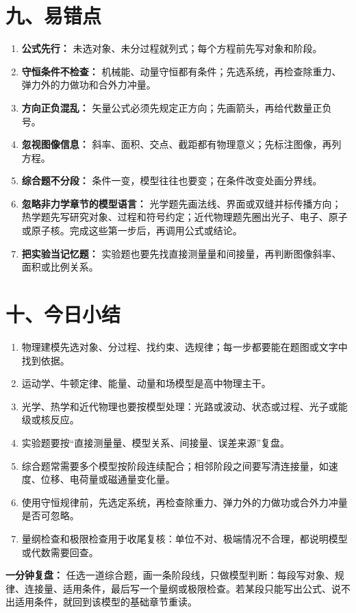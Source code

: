 \section*{九、易错点}
\begin{mistakebox}
\begin{enumerate}
  \item \textbf{公式先行：} 未选对象、未分过程就列式；每个方程前先写对象和阶段。
  \item \textbf{守恒条件不检查：} 机械能、动量守恒都有条件；先选系统，再检查除重力、弹力外的力做功和合外力冲量。
  \item \textbf{方向正负混乱：} 矢量公式必须先规定正方向；先画箭头，再给代数量正负号。
  \item \textbf{忽视图像信息：} 斜率、面积、交点、截距都有物理意义；先标注图像，再列方程。
  \item \textbf{综合题不分段：} 条件一变，模型往往也要变；在条件改变处画分界线。
  \item \textbf{忽略非力学章节的模型语言：} 光学题先画法线、界面或双缝并标传播方向；热学题先写研究对象、过程和符号约定；近代物理题先圈出光子、电子、原子或原子核。完成这些第一步后，再调用公式或结论。
  \item \textbf{把实验当记忆题：} 实验题也要先找直接测量量和间接量，再判断图像斜率、面积或比例关系。
\end{enumerate}
\end{mistakebox}

\section*{十、今日小结}
\begin{enumerate}[nosep]
  \item 物理建模先选对象、分过程、找约束、选规律；每一步都要能在题图或文字中找到依据。
  \item 运动学、牛顿定律、能量、动量和场模型是高中物理主干。
  \item 光学、热学和近代物理也要按模型处理：光路或波动、状态或过程、光子或能级或核反应。
  \item 实验题要按“直接测量量、模型关系、间接量、误差来源”复盘。
  \item 综合题常需要多个模型按阶段连续配合；相邻阶段之间要写清连接量，如速度、位移、电荷量或磁通量变化量。
  \item 使用守恒规律前，先选定系统，再检查除重力、弹力外的力做功或合外力冲量是否可忽略。
  \item 量纲检查和极限检查用于收尾复核：单位不对、极端情况不合理，都说明模型或代数需要回查。
\end{enumerate}

\textbf{一分钟复盘：} 任选一道综合题，画一条阶段线，只做模型判断：每段写对象、规律、连接量、适用条件，最后写一个量纲或极限检查。若某段只能写出公式、说不出适用条件，就回到该模型的基础章节重读。
